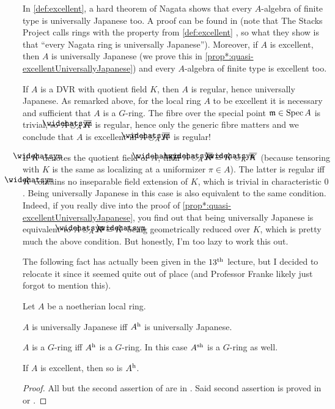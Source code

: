 In \cref{def:excellent}, a hard theorem of Nagata shows that every $A$-algebra of finite type is universally Japanese too. A proof can be found in \cite[]{stacks-project} (note that The Stacks Project calls rings with the property from \cref{def:excellent} , so what they show is that \enquote{every Nagata ring is universally Japanese}). Moreover, if $A$ is excellent, then $A$ is universally Japanese (we prove this in \cref{prop*:quasi-excellentUniversallyJapanese}) and every $A$-algebra of finite type is excellent too.
\begin{exm}
	If $A$ is a DVR with quotient field $K$, then $A$ is regular, hence universally Japanese. As remarked above, for the local ring $A$ to be excellent it is necessary and sufficient that $A$ is a $G$-ring. The fibre over the special point $\mathfrak{m}\in\operatorname{Spec} A$ is trivial, so $\roof{A}\otimes_A\ov{K}$ is regular, hence only the generic fibre matters and we conclude that $A$ is excellent iff $\roof{A}\otimes_A\ov{K}$ is regular!
	
	If $\roof{K}$ denotes the quotient field of $\roof{A}$, then $\roof{A}\otimes_A\ov{K}\cong \roof{K}\otimes_K\ov{K}$ (because tensoring with $K$ is the same as localizing at a uniformizer $\pi\in A$). The latter is regular iff $\roof{K}$ contains no inseparable field extension of $K$, which is trivial in characteristic $0$. Being universally Japanese in this case is also equivalent to the same condition. Indeed, if you really dive into the proof of \cref{prop*:quasi-excellentUniversallyJapanese}, you find out that being universally Japanese is equivalent to $\roof{A}\otimes_AK\cong \roof{K}$ being geometrically reduced over $K$, which is pretty much the above condition. But honestly, I'm too lazy to work this out.
\end{exm}
The following fact has actually been given in the $13^{\text{th}}$ lecture, but I decided to relocate it since it seemed quite out of place (and Professor Franke likely just forgot to mention this).
\begin{fact}\label{fact:G-ringStuff}
	Let $A$ be a noetherian local ring.
	\begin{alphanumerate}
		\item $A$ is universally Japanese iff $A^{\mathrm{h}}$ is universally Japanese.
		\item $A$ is a $G$-ring iff $A^{\mathrm{h}}$ is a $G$-ring. In this case $A^{\mathrm{sh}}$ is a $G$-ring as well.
		\item If $A$ is excellent, then so is $A^{\mathrm{h}}$.
	\end{alphanumerate}
\end{fact}
\begin{proof}
	All but the second assertion of  are in \cite[(18.7)]{egaIV4}. Said second assertion is proved in \cite[]{stacks-project} or \cite[end of I.1]{kiehlfreitag}.
\end{proof}

